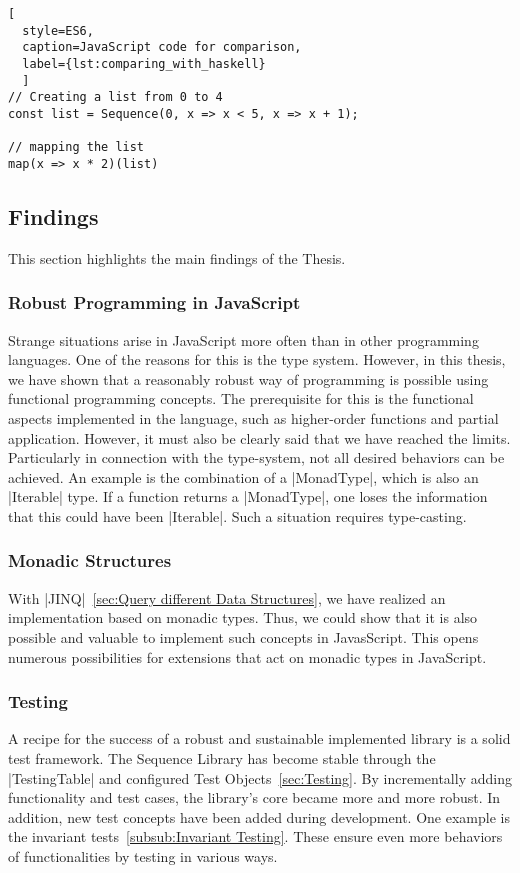 \begin{lstlisting}[
  style=ES6, 
  caption=JavaScript code for comparison,
  label={lst:comparing_with_haskell}
  ]
// Creating a list from 0 to 4
const list = Sequence(0, x => x < 5, x => x + 1);

// mapping the list
map(x => x * 2)(list)
\end{lstlisting}

\subsection{Findings}
\label{sub:Findings}
This section highlights the main findings of the Thesis.

\subsubsection{Robust Programming in JavaScript}
\label{subsub:Robust Programming in JavaScript}
Strange situations arise in JavaScript more often than in other programming
languages. One of the reasons for this is the type system. However, in this
thesis, we have shown that a reasonably robust way of programming is possible
using functional programming concepts. The prerequisite for this is the
functional aspects implemented in the language, such as higher-order functions
and partial application. However, it must also be clearly said that we have
reached the limits. Particularly in connection with the type-system,
not all desired behaviors can be achieved.
An example is the combination of a |MonadType|, which is also an |Iterable|
type. If a function returns a |MonadType|, one loses the information that this
could have been |Iterable|. Such a situation requires type-casting.

\subsubsection{Monadic Structures}
\label{subsub:Monadic Structures}
With |JINQ|~\ref{sec:Query different Data Structures}, we have realized an
implementation based on monadic types. Thus, we could show that it is also
possible and valuable to implement such concepts in JavasScript.
This opens numerous possibilities for extensions that act on monadic types in
JavaScript.

\subsubsection{Testing}
\label{subsub:Testing}
A recipe for the success of a robust and sustainable implemented library is a
solid test framework. The Sequence Library has become stable through the
|TestingTable| and configured Test Objects~\ref{sec:Testing}. By incrementally adding
functionality and test cases, the library's core became more and more robust.
In addition, new test concepts have been added during development. One example
is the invariant tests~\ref{subsub:Invariant Testing}. These ensure even more
behaviors of functionalities by testing in various ways.

